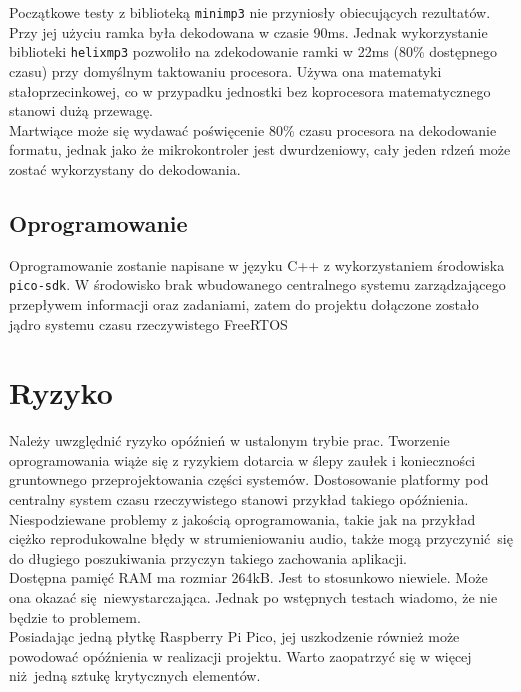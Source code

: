 \documentclass[polish]{aghengthesis}
\begin{document}
			Początkowe testy z biblioteką \lstinline|minimp3|\textsuperscript{\cite{minimp3}} nie przyniosły obiecujących rezultatów.  Przy jej użyciu ramka była dekodowana w czasie 90ms.
			Jednak wykorzystanie biblioteki \lstinline|helixmp3|\textsuperscript{\cite{helixmp3_repo}} pozwoliło na zdekodowanie ramki w 22ms (80\% dostępnego czasu) przy domyślnym taktowaniu procesora. 
			Używa ona matematyki stałoprzecinkowej, co w przypadku jednostki bez koprocesora matematycznego stanowi dużą przewagę.
			$ $\\
			
			Martwiące może się wydawać poświęcenie 80\% czasu procesora na dekodowanie formatu, jednak jako że mikrokontroler jest dwurdzeniowy, cały jeden rdzeń może zostać wykorzystany do dekodowania.
		
		\subsection{Oprogramowanie}
			Oprogramowanie zostanie napisane w języku C++ z wykorzystaniem środowiska \lstinline|pico-sdk|\textsuperscript{\cite{pico_sdk}}.  W środowisko brak wbudowanego centralnego systemu zarządzającego przepływem informacji oraz zadaniami, zatem do projektu dołączone zostało jądro systemu czasu rzeczywistego FreeRTOS\textsuperscript{\cite{freertos_kernel}}
	
	\section{Ryzyko}
		Należy uwzględnić ryzyko opóźnień w ustalonym trybie prac. Tworzenie oprogramowania wiąże się z ryzykiem dotarcia w ślepy zaułek i konieczności gruntownego przeprojektowania części systemów. Dostosowanie platformy pod centralny system czasu rzeczywistego stanowi przykład takiego opóźnienia.
		$ $\\
		
		Niespodziewane problemy z jakością oprogramowania, takie jak na przykład ciężko reprodukowalne błędy w strumieniowaniu audio, także mogą przyczynić się do długiego poszukiwania przyczyn takiego zachowania aplikacji.
		$ $\\
		
		Dostępna pamięć RAM ma rozmiar 264kB. Jest to stosunkowo niewiele. Może ona okazać się niewystarczająca. Jednak po wstępnych testach wiadomo, że nie będzie to problemem.
		$ $\\
		
		Posiadając jedną płytkę Raspberry Pi Pico, jej uszkodzenie również może powodować opóźnienia w realizacji projektu. Warto zaopatrzyć się w więcej niż jedną sztukę krytycznych elementów.
		$ $\\
		
\end{document}
